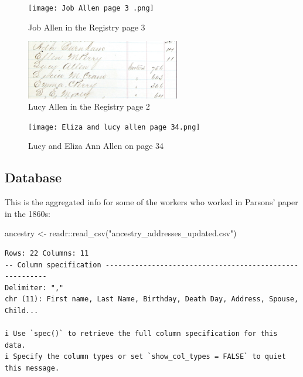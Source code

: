 \documentclass[
  letterpaper,
  DIV=11,
  numbers=noendperiod]{scrartcl}
\newenvironment{Shaded}{\begin{snugshade}}{\end{snugshade}}
\newcommand{\FunctionTok}[1]{\textcolor[rgb]{0.28,0.35,0.67}{#1}}
\newcommand{\NormalTok}[1]{\textcolor[rgb]{0.00,0.23,0.31}{#1}}
\newcommand{\OtherTok}[1]{\textcolor[rgb]{0.00,0.23,0.31}{#1}}
\newcommand{\SpecialCharTok}[1]{\textcolor[rgb]{0.37,0.37,0.37}{#1}}
\newcommand{\StringTok}[1]{\textcolor[rgb]{0.13,0.47,0.30}{#1}}
\begin{document}
\begin{figure}

{\centering \texttt{[image: Job Allen page 3 .png]}

}

\caption{\label{fig-sample7}Job Allen in the Registry page 3}

\end{figure}

\begin{figure}

{\centering \includegraphics[width=0.6\textwidth,height=\textheight]{Lucypg2.jpeg}

}

\caption{\label{fig-sample9}Lucy Allen in the Registry page 2}

\end{figure}

\begin{figure}

{\centering \texttt{[image: Eliza and lucy allen page 34.png]}

}

\caption{\label{fig-sample10}Lucy and Eliza Ann Allen on page 34}

\end{figure}

\hypertarget{database}{%
\subsection{Database}\label{database}}

This is the aggregated info for some of the workers who worked in
Parsons' paper in the 1860s:

\begin{Shaded}
\begin{Highlighting}[]
\NormalTok{ancestry }\OtherTok{\textless{}{-}}\NormalTok{ readr}\SpecialCharTok{::}\FunctionTok{read\_csv}\NormalTok{(}\StringTok{"ancestry\_addresses\_updated.csv"}\NormalTok{)}
\end{Highlighting}
\end{Shaded}

\begin{verbatim}
Rows: 22 Columns: 11
-- Column specification --------------------------------------------------------
Delimiter: ","
chr (11): First name, Last Name, Birthday, Death Day, Address, Spouse, Child...

i Use `spec()` to retrieve the full column specification for this data.
i Specify the column types or set `show_col_types = FALSE` to quiet this message.
\end{verbatim}
\end{document}
